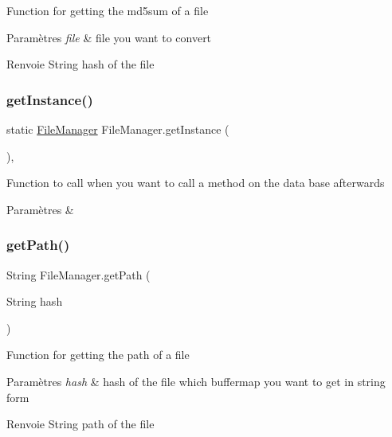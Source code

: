 Function for getting the md5sum of a file


\begin{DoxyParams}{Paramètres}
{\em file} & file you want to convert \\
\hline
\end{DoxyParams}
\begin{DoxyReturn}{Renvoie}
String hash of the file 
\end{DoxyReturn}
\mbox{\label{classFileManager_a4b451acca58b1ad1915a855e2f3668f2}} 
\subsubsection{\texorpdfstring{get\+Instance()}{getInstance()}}
{\footnotesize\ttfamily static \hyperlink{classFileManager}{File\+Manager} File\+Manager.\+get\+Instance (\begin{DoxyParamCaption}{ }\end{DoxyParamCaption})\hspace{0.3cm}{\ttfamily [inline]}, {\ttfamily [static]}}

Function to call when you want to call a method on the data base afterwards


\begin{DoxyParams}{Paramètres}
{\em } & \\
\hline
\end{DoxyParams}
\mbox{\label{classFileManager_a38d375f288f94fe973ef2352fe7f2e25}} 
\subsubsection{\texorpdfstring{get\+Path()}{getPath()}}
{\footnotesize\ttfamily String File\+Manager.\+get\+Path (\begin{DoxyParamCaption}\item[{String}]{hash }\end{DoxyParamCaption})\hspace{0.3cm}{\ttfamily [inline]}}

Function for getting the path of a file


\begin{DoxyParams}{Paramètres}
{\em hash} & hash of the file which buffermap you want to get in string form \\
\hline
\end{DoxyParams}
\begin{DoxyReturn}{Renvoie}
String path of the file 
\end{DoxyReturn}
\mbox{\label{classFileManager_a58104212e362f362702ff179c484f4c8}} 
